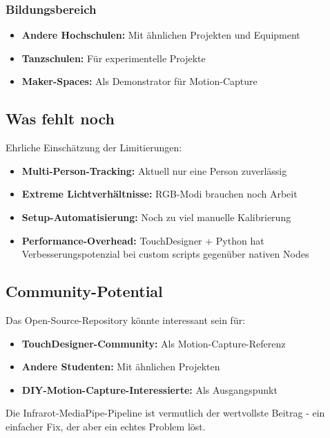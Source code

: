 \subsubsection{Bildungsbereich}
\begin{itemize}
    \item \textbf{Andere Hochschulen:} Mit ähnlichen Projekten und Equipment
    \item \textbf{Tanzschulen:} Für experimentelle Projekte
    \item \textbf{Maker-Spaces:} Als Demonstrator für Motion-Capture
\end{itemize}

\subsection{Was fehlt noch}

Ehrliche Einschätzung der Limitierungen:
\begin{itemize}
    \item \textbf{Multi-Person-Tracking:} Aktuell nur eine Person zuverlässig
    \item \textbf{Extreme Lichtverhältnisse:} RGB-Modi brauchen noch Arbeit
    \item \textbf{Setup-Automatisierung:} Noch zu viel manuelle Kalibrierung
    \item \textbf{Performance-Overhead:} TouchDesigner + Python hat Verbesserungspotenzial bei custom scripts gegenüber nativen Nodes
\end{itemize}

\subsection{Community-Potential}

Das Open-Source-Repository könnte interessant sein für:
\begin{itemize}
    \item \textbf{TouchDesigner-Community:} Als Motion-Capture-Referenz
    \item \textbf{Andere Studenten:} Mit ähnlichen Projekten
    \item \textbf{DIY-Motion-Capture-Interessierte:} Als Ausgangspunkt
\end{itemize}

Die Infrarot-MediaPipe-Pipeline ist vermutlich der wertvollste Beitrag - ein einfacher Fix, der aber ein echtes Problem löst.